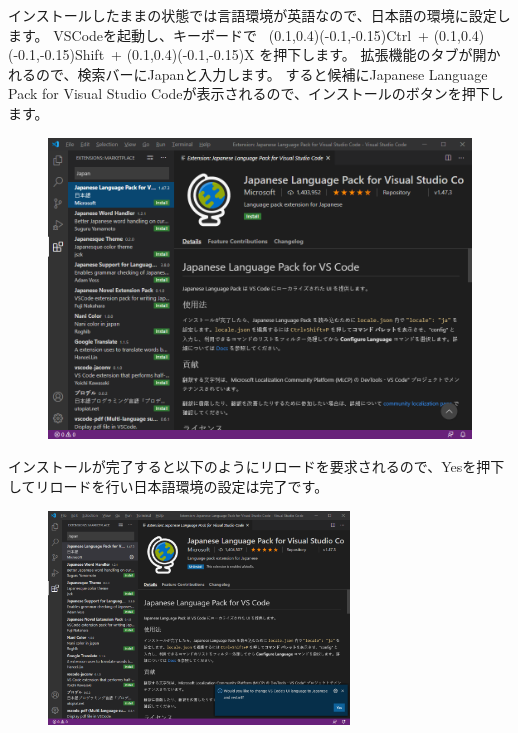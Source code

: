			インストールしたままの状態では言語環境が英語なので、日本語の環境に設定します。
			VSCodeを起動し、キーボードで~
			(0.1,0.4)(-0.1,-0.15)Ctrl~+
			(0.1,0.4)(-0.1,-0.15)Shift~+
			(0.1,0.4)(-0.1,-0.15)X
			を押下します。
			拡張機能のタブが開かれるので、検索バーにJapanと入力します。
			すると候補にJapanese Language Pack for Visual Studio Codeが表示されるので、インストールのボタンを押下します。
			\begin{figure}[H]
				\centering
				\includegraphics[width=120mm,trim=0 300 0 0,clip]{VSCode-lang-ja.png}
			\end{figure}
			インストールが完了すると以下のようにリロードを要求されるので、Yesを押下してリロードを行い日本語環境の設定は完了です。
			\begin{figure}[H]
				\centering
				\includegraphics[width=80mm,trim=420 10 0 435,clip]{VSCode-lang-ja-installed.png}
			\end{figure}

